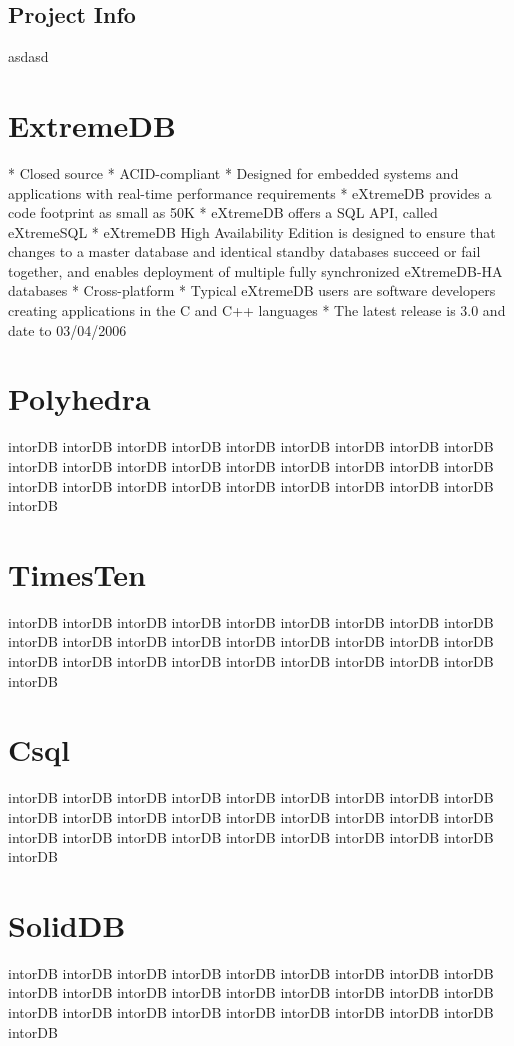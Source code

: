 			\subsection{Project Info}
asdasd
		
		\section{ExtremeDB}
	    * Closed source
    * ACID-compliant
    * Designed for embedded systems and applications with real-time performance requirements
    * eXtremeDB provides a code footprint as small as 50K
    * eXtremeDB offers a SQL API, called eXtremeSQL
    * eXtremeDB High Availability Edition is designed to ensure that changes to a master database and identical standby databases succeed or fail together, and enables deployment of multiple fully synchronized eXtremeDB-HA databases
    * Cross-platform
    * Typical eXtremeDB users are software developers creating applications in the C and C++ languages
    * The latest release is 3.0 and date to 03/04/2006 
		
		\section{Polyhedra}
		intorDB intorDB intorDB intorDB intorDB intorDB intorDB 
		intorDB intorDB intorDB intorDB intorDB intorDB intorDB 
		intorDB intorDB intorDB intorDB intorDB intorDB intorDB 
		intorDB intorDB intorDB intorDB intorDB intorDB intorDB 
		
		\section{TimesTen}
		intorDB intorDB intorDB intorDB intorDB intorDB intorDB 
		intorDB intorDB intorDB intorDB intorDB intorDB intorDB 
		intorDB intorDB intorDB intorDB intorDB intorDB intorDB 
		intorDB intorDB intorDB intorDB intorDB intorDB intorDB 
		
		\section{Csql}
		intorDB intorDB intorDB intorDB intorDB intorDB intorDB 
		intorDB intorDB intorDB intorDB intorDB intorDB intorDB 
		intorDB intorDB intorDB intorDB intorDB intorDB intorDB 
		intorDB intorDB intorDB intorDB intorDB intorDB intorDB 
		
		\section{SolidDB}
		intorDB intorDB intorDB intorDB intorDB intorDB intorDB 
		intorDB intorDB intorDB intorDB intorDB intorDB intorDB 
		intorDB intorDB intorDB intorDB intorDB intorDB intorDB 
		intorDB intorDB intorDB intorDB intorDB intorDB intorDB 
		
